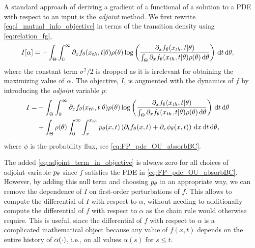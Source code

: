 \documentclass[12pt]{article}
\begin{document}
A standard approach of deriving a gradient of a
functional of a solution to a PDE with respect to an input is the {\sl
  adjoint}  method. We first rewrite
\cref{eq:J_mutual_info_objective} in terms of the transition density using
\cref{eq:relation_fg},
\begin{equation}
I[{\alpha}] = 
- \int_\Theta \int_0^\infty
	   {\partial}_xf_{\theta}({ x_{th} }, t|{\theta})  \rho({\theta}) 
		\log \left( \frac{{\partial}_xf_{\theta}({ x_{th} }, t|{\theta})}
						{\int_\Theta {\partial}_xf_{\theta}({ x_{th} }, t|{\theta})\rho({\theta})
\, \mathrm{d} {\theta} } \right)
\, \mathrm{d} t\, \mathrm{d} {\theta},
\label{eq:I_mutual_info_objective_in_terms_of_dixf} 
\end{equation}
where the constant term $\sigma^2/2$ is dropped as it is irrelevant for
obtaining the maximizing value of ${\alpha}$.
The objective, $I$, is augmented with the dynamics of $f$ by introducing the {\sl
adjoint} variable $p$: 
\begin{align}
\nonumber
I=&  -
\int_\Theta \int_0^\infty 
	  {\partial}_xf_{\theta}({ x_{th} }, t|{\theta})  \rho({\theta}) 
		\log \left( \frac{{\partial}_xf_{\theta}({ x_{th} }, t|{\theta})}
						{\int_\Theta {\partial}_xf_{\theta}({ x_{th} }, t|{\theta})\rho({\theta})\, \mathrm{d} {\theta} } \right)
\, \mathrm{d} t\, \mathrm{d} {\theta} 
\\
	  &+ \int_\Theta  \rho({\theta})  \int_0^\infty \int_{x_-}^{{ x_{th} }}
	  		p_{\theta} (x,t) \left({\partial}_t f_{\theta} (x,t)+ {\partial}_x \phi_{\theta}(x,t) \right) 
  				\, \mathrm{d} x	  \, \mathrm{d} t \, \mathrm{d} {\theta},
	  \label{eq:adjoint_term_in_objective} 
\end{align}
where $\phi$ is the probability flux, see \cref{eq:FP_pde_OU_absorbBC}.

The added \cref{eq:adjoint_term_in_objective} is always zero for all
choices of adjoint variable $p_{\theta}$ 
since $f$ satisfies the PDE in \cref{eq:FP_pde_OU_absorbBC}. However,
by adding this null term and choosing $p_{\theta}$ in an appropriate way,
we can
remove the dependence of $I$ on first-order perturbations of $f$. This allows to
compute the differential of $I$ with respect to $\alpha$, without needing to
additionally compute the differential of $f$ with respect to $\alpha$ as the
chain rule would otherwise require. This is useful, since the
differential of $f$ with respect to $\alpha$ is a complicated mathematical
object because any value of $f(x,t)$ depends on the entire history of
${\alpha}(\cdot)$, i.e., on all values $\alpha(s)$ for $s\leq t$.
\end{document}
